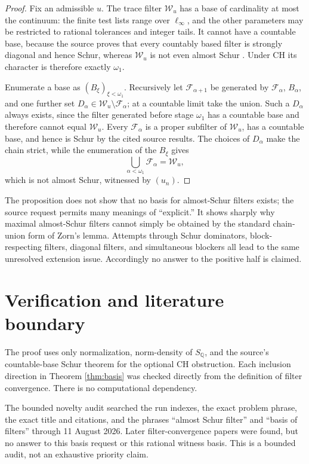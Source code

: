 \documentclass[10pt]{article}
\newcommand{\Q}{\mathbb Q}
\newcommand{\F}{\mathcal F}
\newcommand{\W}{\mathcal W}
\begin{document}
\begin{proof}
Fix an admissible $u$.  The trace filter $\W_u$ has a base of cardinality at
most the continuum: the finite test lists range over $\ell_\infty$, and the
other parameters may be restricted to rational tolerances and integer tails.
It cannot have a countable base, because the source proves that every
countably based filter is strongly diagonal and hence Schur, whereas $\W_u$
is not even almost Schur \cite[Corollary 4.5 and Theorem 3.5]{source}.  Under
CH its character is therefore exactly $\omega_1$.

Enumerate a base as $(B_\xi)_{\xi<\omega_1}$.  Recursively let
$\F_{\alpha+1}$ be generated by $\F_\alpha$, $B_\alpha$, and one further
set $D_\alpha\in\W_u\setminus\F_\alpha$; at a countable limit take the union.
Such a $D_\alpha$ always exists, since the filter generated before stage
$\omega_1$ has a countable base and therefore cannot equal $\W_u$.  Every
$\F_\alpha$ is a proper subfilter of $\W_u$, has a countable base, and hence
is Schur by the cited source results.  The choices of $D_\alpha$ make the
chain strict, while the enumeration of the $B_\xi$ gives
\[
 \bigcup_{\alpha<\omega_1}\F_\alpha=\W_u,
\]
which is not almost Schur, witnessed by $(u_n)$.
\end{proof}

The proposition does not show that no basis for almost-Schur filters exists;
the source request permits many meanings of ``explicit.''  It shows sharply
why maximal almost-Schur filters cannot simply be obtained by the standard
chain-union form of Zorn's lemma.  Attempts through Schur dominators,
block-respecting filters, diagonal filters, and simultaneous blockers all
lead to the same unresolved extension issue.  Accordingly no answer to the
positive half is claimed.

\section*{Verification and literature boundary}

The proof uses only normalization, norm-density of $S_{\Q}$, and the source's
countable-base Schur theorem for the optional CH obstruction.  Each inclusion
direction in Theorem \ref{thm:basis} was checked directly from the definition
of filter convergence.  There is no computational dependency.

The bounded novelty audit searched the run indexes, the exact problem phrase,
the exact title and citations, and the phrases ``almost Schur filter'' and
``basis of filters'' through 11 August 2026.  Later filter-convergence papers
were found, but no answer to this basis request or this rational witness basis.
This is a bounded audit, not an exhaustive priority claim.
\end{document}
